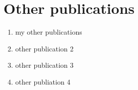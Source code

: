 \chapter[Other publications]{Other publications}

\begin{enumerate}
  \setcounter{enumi}{0}
  \item my other publications
  \item other publication 2
  \item other publication 3
  \item other publiation 4
\end{enumerate}

